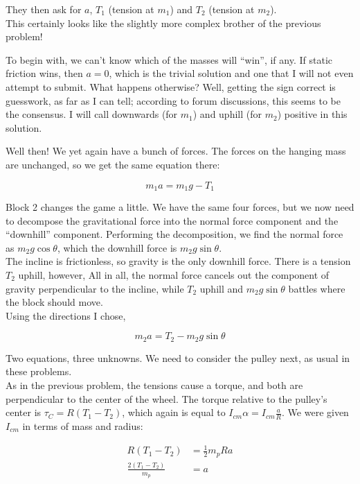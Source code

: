 \documentclass[8.01x]{subfiles}
\begin{document}
They then ask for $a$, $T_1$ (tension at $m_1$) and $T_2$ (tension at $m_2$).\\
This certainly looks like the slightly more complex brother of the previous problem!

To begin with, we can't know which of the masses will ``win'', if any. If static friction wins, then $a = 0$, which is the trivial solution and one that I will not even attempt to submit. What happens otherwise? Well, getting the sign correct is guesswork, as far as I can tell; according to forum discussions, this seems to be the consensus. I will call downwards (for $m_1$) and uphill (for $m_2$) positive in this solution.

Well then! We yet again have a bunch of forces. The forces on the hanging mass are unchanged, so we get the same equation there:

\begin{equation}
m_1 a = m_1 g - T_1
\end{equation}

Block 2 changes the game a little. We have the same four forces, but we now need to decompose the gravitational force into the normal force component and the ``downhill'' component.
Performing the decomposition, we find the normal force as $m_2 g \cos \theta$, which the downhill force is $m_2 g \sin \theta$.\\
The incline is frictionless, so gravity is the only downhill force. There is a tension $T_2$ uphill, however, All in all, the normal force cancels out the component of gravity perpendicular to the incline, while $T_2$ uphill and $m_2 g \sin \theta$ battles where the block should move.\\
Using the directions I chose,

\begin{equation}
m_2 a = T_2 - m_2 g \sin \theta
\end{equation}

Two equations, three unknowns. We need to consider the pulley next, as usual in these problems.\\
As in the previous problem, the tensions cause a torque, and both are perpendicular to the center of the wheel. The torque relative to the pulley's center is $\tau_C = R(T_1 - T_2)$, which again is equal to $I_{cm} \alpha = I_{cm} \frac{a}{R}$. We were given $I_{cm}$ in terms of mass and radius:

\begin{align}
R(T_1 - T_2) &= \frac{1}{2} m_p R a\\
\frac{2(T_1 - T_2)}{m_p} &= a
\end{align}
\end{document}
